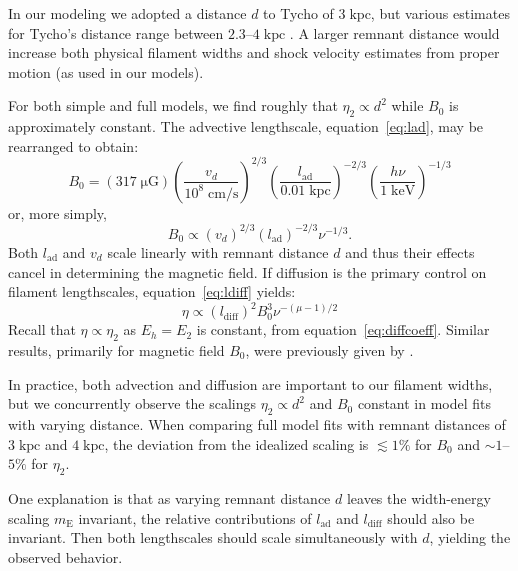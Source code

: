 \documentclass[iop, apj, numberedappendix, twocolappendix]{emulateapj}
\newcommand*{\mt}{\mathrm}
\newcommand*{\unit}[1]{\;\mt{#1}}  %
\newcommand*{\abt}{\mathord{\sim}} %
\newcommand*{\mE}{m_\mt{E}}
\newcommand*{\muG}{\unit{\mu G}}
\begin{document}
In our modeling we adopted a distance $d$ to Tycho of $3 \unit{kpc}$, but
various estimates for Tycho's distance range between $2.3$--$4 \unit{kpc}$
\citep{hayato2010}.  A larger remnant distance would increase both physical
filament widths and shock velocity estimates from proper motion (as used in our
models).

For both simple and full models, we find roughly that $\eta_2 \propto d^2$
while $B_0$ is approximately constant.  The advective lengthscale,
equation~\eqref{eq:lad}, may be rearranged to obtain:
\begin{equation}
    B_0 = (317 \muG) \left(\frac{v_d}{10^8 \unit{cm/s}}\right)^{2/3}
                     \left(\frac{l_{\mt{ad}}}{0.01 \unit{kpc}}\right)^{-2/3}
                     \left(\frac{h\nu}{1 \unit{keV}}\right)^{-1/3}
\end{equation}
or, more simply,
\begin{equation}
    B_0 \propto \left(v_d\right)^{2/3}
                \left(l_{\mt{ad}}\right)^{-2/3} \nu^{-1/3} .
\end{equation}
Both $l_{\mt{ad}}$ and $v_d$ scale linearly with remnant distance $d$ and thus
their effects cancel in determining the magnetic field.  If diffusion is the
primary control on filament lengthscales, equation~\eqref{eq:ldiff} yields:
\begin{equation}
    \eta \propto \left(l_{\mt{diff}}\right)^2 B_0^{3} \nu^{-(\mu - 1)/2}
\end{equation}
Recall that $\eta \propto \eta_2$ as $E_h = E_2$ is constant, from
equation~\eqref{eq:diffcoeff}.
Similar results, primarily for magnetic field $B_0$, were previously given by
\citet{parizot2006}.

In practice, both advection and diffusion are important to our filament widths,
but we concurrently observe the scalings $\eta_2 \propto d^2$ and $B_0$
constant in model fits with varying distance.  When comparing full model fits
with remnant distances of $3 \unit{kpc}$ and $4 \unit{kpc}$, the deviation from
the idealized scaling is $\lesssim 1 \%$ for $B_0$ and $\abt 1$--$5\%$ for
$\eta_2$.

One explanation is that as varying remnant distance $d$ leaves the width-energy
scaling $\mE$ invariant, the relative contributions of $l_{\mt{ad}}$ and
$l_{\mt{diff}}$ should also be invariant.  Then both lengthscales should
scale simultaneously with $d$, yielding the observed behavior.
\end{document}
